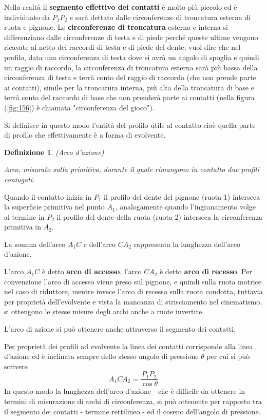 \documentclass[a4paper, 15pt]{article}
\newtheorem*{deff}{Definizione}
\begin{document}
\begin{adjustwidth}{2in}{}
	 Nella realtà il \textbf{segmento effettivo dei contatti} è molto più piccolo ed è individuato da $P_1P_2$ e sarà dettato dalle circonferenze di troncatura esterna di ruota e pignone.
\newpage	 
	 Le \textbf{circonferenze di troncatura} esterna e interna si differenziano dalle circonferenze di testa e di piede perché queste ultime vengono ricavate al netto dei raccordi di testa e di piede del dente; vuol dire che nel profilo, data una circonferenza di testa dove si avrà un angolo di spoglia e quindi un raggio di raccordo, la circonferenza di troncatura esterna sarà più bassa della circonferenza di testa e terrà conto del raggio di raccordo (che non prende parte ai contatti), simile per la troncatura interna, più alta della troncatura di base e terrà conto del raccordo di base che non prenderà parte ai contatti (nella figura (\ref{fig:156}) è chiamata "circonferenza del gioco"). 
	 
	 Si definisce in questo modo l'entità del profilo utile al contatto cioè quella parte di profilo che effettivamente è a forma di evolvente. \newline	 	 
	 
	 \begin{deff}(Arco d'azione)
	 	
	 	Arco, misurato sulla primitiva, durante il quale rimangono in contatto due
	 profili coniugati. \newline
	 \end{deff}
	 
	 Quando il contatto inizia in $P_1$ il profilo del dente del pignone (ruota 1) interseca la superficie primitiva nel punto $A_1$, analogamente quando l'ingranamento volge al termine in $P_2$ il profilo del dente della ruota (ruota 2) interseca la circonferenza primitiva in $A_2$.
	 
	 La somma dell'arco $A_1C$ e dell'arco $CA_2$ rappresenta la lunghezza dell'arco d'azione.
	 
	 L'arco $A_1C$ è detto \textbf{arco di accesso}, l'arco $CA_2$ è detto \textbf{arco di recesso}. Per convenzione l'arco di accesso viene preso sul pignone, e quindi sulla ruota motrice nel caso di riduttore, mentre invece l'arco di recesso sulla ruota condotta, tuttavia per proprietà dell'evolvente e vista la mancanza di strisciamento nel cinematismo, si ottengono le stesse misure degli archi anche a ruote invertite. \newline
	 
	 L'arco di azione si può ottenere anche attraverso il segmento dei contatti.
	 
	 Per proprietà dei profili ad evolvente la linea dei contatti corrisponde alla linea d'azione ed è inclinata sempre dello stesso angolo di pressione $\theta$ per cui si può scrivere
	 \[A_1CA_2 = \dfrac{P_1P_2}{\cos\theta}\]
	 In questo modo la lunghezza dell'arco d'azione - che è difficile da ottenere in termini di misurazione di archi di circonferenza, si può ottenente per rapporto tra il segmento dei contatti - termine rettilineo - ed il coseno dell'angolo di pressione.
\end{adjustwidth}
\newpage
\end{document}
